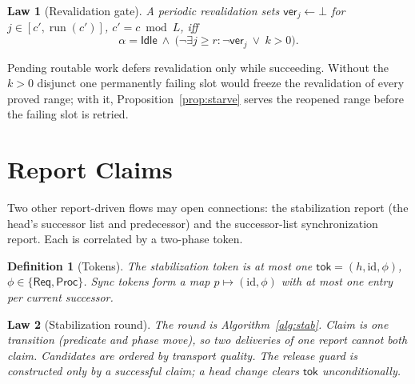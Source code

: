 \documentclass[journal]{IEEEtran}
\newtheorem{definition}{Definition}
\newtheorem{law}{Law}
\newcommand{\run}{\operatorname{run}}
\newcommand{\ver}{\mathsf{ver}}
\newcommand{\tok}{\mathsf{tok}}
\newcommand{\Idle}{\mathsf{Idle}}
\newcommand{\Req}{\mathsf{Req}}
\newcommand{\Proc}{\mathsf{Proc}}
\newcommand{\att}{\alpha}
\begin{document}
\begin{law}[Revalidation gate]\label{law:revalidate}
A periodic revalidation sets $\ver_j\gets\bot$ for $j\in[c',\run(c')]$,
$c'=c\bmod L$, iff
\[
\att=\Idle\ \wedge\ \bigl(\neg\exists j\ge r:\neg\ver_j\ \vee\ k>0\bigr).
\]
\end{law}

Pending routable work defers revalidation only while succeeding.  Without
the $k>0$ disjunct one permanently failing slot would freeze the
revalidation of every proved range; with it, Proposition~\ref{prop:starve}
serves the reopened range before the failing slot is retried.

\section{Report Claims}\label{sec:claims}

Two other report-driven flows may open connections: the stabilization
report (the head's successor list and predecessor) and the successor-list
synchronization report.  Each is correlated by a two-phase token.

\begin{definition}[Tokens]\label{def:tokens}
The stabilization token is at most one $\tok=(h,\mathrm{id},\phi)$,
$\phi\in\{\Req,\Proc\}$.  Sync tokens form a map $p\mapsto(\mathrm{id},\phi)$
with at most one entry per current successor.
\end{definition}

\begin{law}[Stabilization round]\label{law:stab}
The round is Algorithm~\ref{alg:stab}.  Claim is one transition (predicate
and phase move), so two deliveries of one report cannot both claim.  Candidates
are ordered by transport quality.  The release guard is constructed only by
a successful claim; a head change clears $\tok$ unconditionally.
\end{law}
\end{document}
